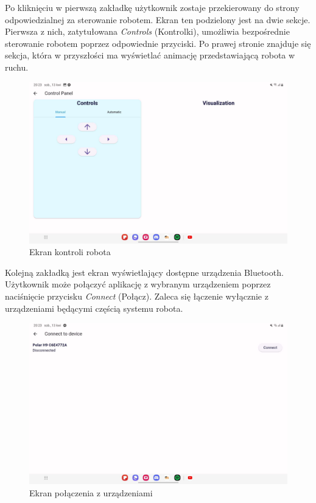 \documentclass{report}
\begin{document}
Po kliknięciu w pierwszą zakładkę użytkownik zostaje przekierowany do strony odpowiedzialnej za sterowanie robotem. Ekran ten podzielony jest na dwie sekcje. Pierwsza z nich, zatytułowana \textit{Controls} (Kontrolki), umożliwia bezpośrednie sterowanie robotem poprzez odpowiednie przyciski. Po prawej stronie znajduje się sekcja, która w przyszłości ma wyświetlać animację przedstawiającą robota w ruchu.

\begin{figure}[H]
    \centering
    \includegraphics[width=1.0\textwidth]{src/app/control.jpg}
    \caption{Ekran kontroli robota}
    \label{fig:control}
\end{figure}

Kolejną zakładką jest ekran wyświetlający dostępne urządzenia Bluetooth. Użytkownik może połączyć aplikację z wybranym urządzeniem poprzez naciśnięcie przycisku \textit{Connect} (Połącz). Zaleca się łączenie wyłącznie z urządzeniami będącymi częścią systemu robota.

\begin{figure}[H]
    \centering
    \includegraphics[width=1.0\textwidth]{src/app/list-devices.jpg}
    \caption{Ekran połączenia z urządzeniami}
    \label{fig:Connect}
\end{figure}
\end{document}
